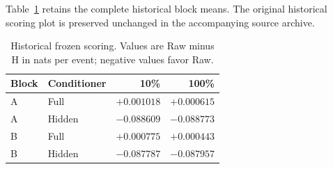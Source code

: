 \documentclass[11pt]{article}
\begin{document}
Table~\ref{tab:confirmation} retains the complete historical block means. The original historical scoring plot is preserved unchanged in the accompanying source archive.

\begin{table}[t]
\centering
\caption{Historical frozen scoring. Values are Raw minus H in
nats per event; negative values favor Raw.}
\label{tab:confirmation}
\begin{tabular}{llrr}
\toprule
Block & Conditioner & 10\% & 100\% \\
\midrule
A & Full & $+0.001018$ & $+0.000615$ \\
A & Hidden & $-0.088609$ & $-0.088773$ \\
B & Full & $+0.000775$ & $+0.000443$ \\
B & Hidden & $-0.087787$ & $-0.087957$ \\
\bottomrule
\end{tabular}
\end{table}


\clearpage
\end{document}
